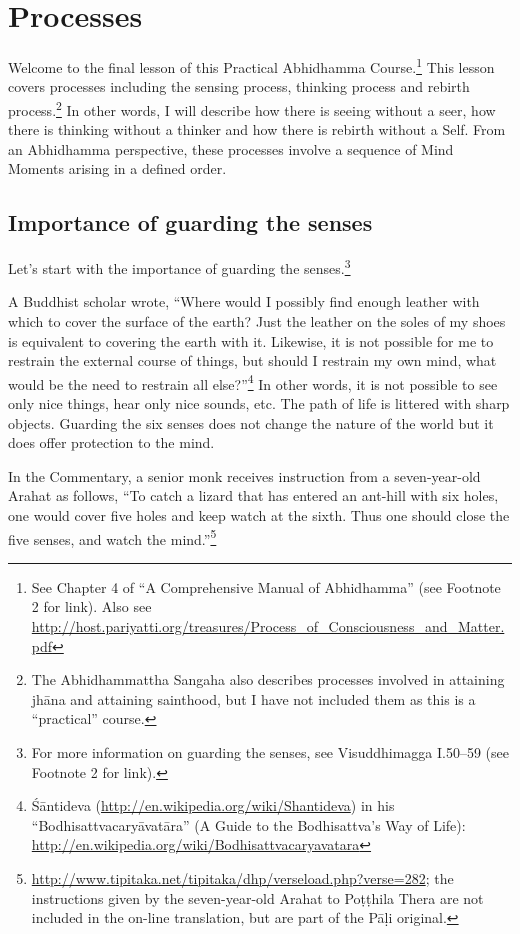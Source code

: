 \section{Processes}

Welcome to the final lesson of this Practical Abhidhamma Course.\footnote{See Chapter 4 of “A Comprehensive Manual of Abhidhamma” (see Footnote 2 for link). \newline Also see \url{http://host.pariyatti.org/treasures/Process_of_Consciousness_and_Matter.pdf}} This lesson covers processes including the sensing process, thinking process and rebirth process.\footnote{The Abhidhammattha Sangaha also describes processes involved in attaining jhāna and attaining sainthood, but I have not included them as this is a “practical” course.} In other words, I will describe how there is seeing without a seer, how there is thinking without a thinker and how there is rebirth without a Self. From an Abhidhamma perspective, these processes involve a sequence of Mind Moments arising in a defined order.

\subsection*{Importance of guarding the senses}

Let's start with the importance of guarding the senses.\footnote{For more information on guarding the senses, see Visuddhimagga I.50--59 (see Footnote 2 for link).}

A Buddhist scholar wrote, “Where would I possibly find enough leather with which to cover the surface of the earth? Just the leather on the soles of my shoes is equivalent to covering the earth with it. Likewise, it is not possible for me to restrain the external course of things, but should I restrain my own mind, what would be the need to restrain all else?”\footnote{Śāntideva (\url{http://en.wikipedia.org/wiki/Shantideva}) in his “Bodhisattvacaryāvatāra” (A Guide to the Bodhisattva’s Way of Life): \url{http://en.wikipedia.org/wiki/Bodhisattvacaryavatara}} In other words, it is not possible to see only nice things, hear only nice sounds, etc. The path of life is littered with sharp objects. Guarding the six senses does not change the nature of the world but it does offer protection to the mind.

In the Commentary, a senior monk receives instruction from a seven-year-old Arahat as follows, “To catch a lizard that has entered an ant-hill with six holes, one would cover five holes and keep watch at the sixth. Thus one should close the five senses, and watch the mind.”\footnote{\url{http://www.tipitaka.net/tipitaka/dhp/verseload.php?verse=282}; the instructions given by the seven-year-old Arahat to Poṭṭhila Thera are not included in the on-line translation, but are part of the Pāḷi original.}


